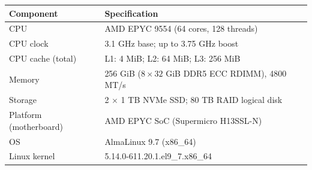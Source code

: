 \small
\renewcommand{\arraystretch}{1.15}
\begin{tabular}{@{}ll@{}}
\toprule
Component & Specification \\
\midrule
CPU & AMD EPYC 9554 (64 cores, 128 threads) \\
CPU clock & 3.1 GHz base; up to 3.75 GHz boost \\
CPU cache (total) & L1: 4 MiB; L2: 64 MiB; L3: 256 MiB \\
Memory & 256 GiB ($8 \times 32$ GiB DDR5 ECC RDIMM), 4800 MT/s \\
Storage & 2 $\times$ 1 TB NVMe SSD; 80 TB RAID logical disk \\
Platform (motherboard) & AMD EPYC SoC (Supermicro H13SSL-N) \\
OS & AlmaLinux 9.7 (x86\_64) \\
Linux kernel & 5.14.0-611.20.1.el9\_7.x86\_64 \\
\bottomrule
\end{tabular}
